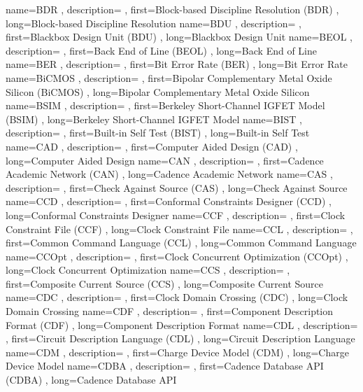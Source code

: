 { name={BDR}
, description={}
, first={Block-based Discipline Resolution (BDR)}
, long={Block-based Discipline Resolution}
}
{ name={BDU}
, description={}
, first={Blackbox Design Unit (BDU)}
, long={Blackbox Design Unit}
}
{ name={BEOL}
, description={}
, first={Back End of Line (BEOL)}
, long={Back End of Line}
}
{ name={BER}
, description={}
, first={Bit Error Rate (BER)}
, long={Bit Error Rate}
}
{ name={BiCMOS}
, description={}
, first={Bipolar Complementary Metal Oxide Silicon (BiCMOS)}
, long={Bipolar Complementary Metal Oxide Silicon}
}
{ name={BSIM}
, description={}
, first={Berkeley Short-Channel IGFET Model (BSIM)}
, long={Berkeley Short-Channel IGFET Model}
}
{ name={BIST}
, description={}
, first={Built-in Self Test (BIST)}
, long={Built-in Self Test}
}
{ name={CAD}
, description={}
, first={Computer Aided Design (CAD)}
, long={Computer Aided Design}
}
{ name={CAN}
, description={}
, first={Cadence Academic Network (CAN)}
, long={Cadence Academic Network}
}
{ name={CAS}
, description={}
, first={Check Against Source (CAS)}
, long={Check Against Source}
}
{ name={CCD}
, description={}
, first={Conformal Constraints Designer (CCD)}
, long={Conformal Constraints Designer}
}
{ name={CCF}
, description={}
, first={Clock Constraint File (CCF)}
, long={Clock Constraint File}
}
{ name={CCL}
, description={}
, first={Common Command Language (CCL)}
, long={Common Command Language}
}
{ name={CCOpt}
, description={}
, first={Clock Concurrent Optimization (CCOpt)}
, long={Clock Concurrent Optimization}
}
{ name={CCS}
, description={}
, first={Composite Current Source (CCS)}
, long={Composite Current Source}
}
{ name={CDC}
, description={}
, first={Clock Domain Crossing (CDC)}
, long={Clock Domain Crossing}
}
{ name={CDF}
, description={}
, first={Component Description Format (CDF)}
, long={Component Description Format}
}
{ name={CDL}
, description={}
, first={Circuit Description Language (CDL)}
, long={Circuit Description Language}
}
{ name={CDM}
, description={}
, first={Charge Device Model (CDM)}
, long={Charge Device Model}
}
{ name={CDBA}
, description={}
, first={Cadence Database API (CDBA)}
, long={Cadence Database API}
}
